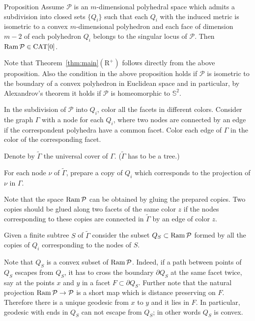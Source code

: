 \documentclass[oneside,a4paper]{article}
\def\Ram{\mathop{\rm Ram}\nolimits}
\def\SS{\mathbb{S}}
\begin{document}
\begin{thm}{Proposition}\label{prop:ramresh}
Assume $\mathcal{P}$ is an $m$-dimensional polyhedral space which
admits a subdivision into closed sets $\{Q_i\}$
such that each $Q_i$ with the induced metric is isometric to a convex $m$-dimensional polyhedron and each face  of dimension $m-2$ of each polyhedron $Q_i$ belongs to the singular locus of $\mathcal{P}$.
Then $\Ram \mathcal{P}\in\CAT[0]$.
\end{thm}

Note that Theorem~\ref{thm:main}$(\mathrm{R}^+)$
follows directly from the above proposition.
Also the condition in the above proposition holds if $\mathcal{P}$ is isometric to the boundary of a convex polyhedron in Euclidean space
and in particular, by Alexandrov's theorem it holds if $\mathcal{P}$ is homeomorphic to $\SS^2$.

In the subdivision of $\mathcal{P}$ into $Q_i$,
color all the facets%
in different colors.
Consider the graph $\Gamma$ with a node for each $Q_i$, where two nodes are connected by an edge if the correspondent polyhedra have a common facet. Color each edge of $\Gamma$ in the color of the corresponding facet.

Denote by $\tilde\Gamma$ the universal cover of $\Gamma$.
($\tilde\Gamma$ has to be a tree.)

For each node $\nu$ of $\tilde\Gamma$,  prepare a copy of $Q_i$ which corresponds to the projection of $\nu$ in $\Gamma$.

Note that  the space $\Ram\mathcal{P}$
can be obtained by gluing the prepared copies.
Two copies should be glued along two facets of the same color $z$
if the nodes corresponding to these copies are connected in $\tilde\Gamma$
by an edge of color $z$.

Given a finite subtree $S$ of $\tilde \Gamma$
consider the subset $Q_S\subset \Ram\mathcal{P}$
formed by all the copies of $Q_i$ corresponding to the nodes of $S$.

Note that $Q_S$ is a convex subset of $\Ram\mathcal{P}$.
Indeed, if a path between points of $Q_S$ escapes from $Q_S$,
it has to cross the boundary $\partial Q_S$
at the same facet twice, say at the points $x$ and $y$ in 
a facet $F\subset\partial Q_S$.
Further note that the natural projection $\Ram\mathcal{P}\to \mathcal{P}$ is a short map which is distance preserving on $F$.
Therefore there is a unique geodesic from $x$ to $y$ and it lies in $F$.
In particular, geodesic with ends in $Q_S$ can not escape from $Q_S$;
in other words $Q_S$ is convex.
\end{document}

